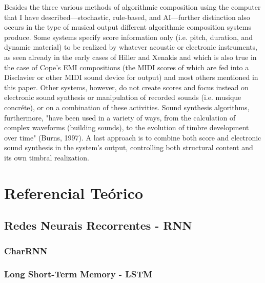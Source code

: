 \documentclass{automatextcc}
\begin{document}
Besides the three various methods of algorithmic composition using the computer that I have described—stochastic, rule-based, and AI—further distinction also occurs in the type of musical output different algorithmic composition systems produce. Some systems specify score information only (i.e. pitch, duration, and dynamic material) to be realized by whatever acoustic or electronic instruments, as seen already in the early cases of Hiller and Xenakis and which is also true in the case of Cope's EMI compositions (the MIDI scores of which are fed into a Disclavier or other MIDI sound device for output) and most others mentioned in this paper. Other systems, however, do not create scores and focus instead on electronic sound synthesis or manipulation of recorded sounds (i.e. musique concréte), or on a combination of these activities. Sound synthesis algorithms, furthermore, "have been used in a variety of ways, from the calculation of complex waveforms (building sounds), to the evolution of timbre development over time" (Burns, 1997). A last approach is to combine both score and electronic sound synthesis in the system's output, controlling both structural content and its own timbral realization.





\section{Referencial Teórico}

\subsection{Redes Neurais Recorrentes - RNN}

\subsubsection{CharRNN}
\subsubsection{Long Short-Term Memory - LSTM}
\end{document}
